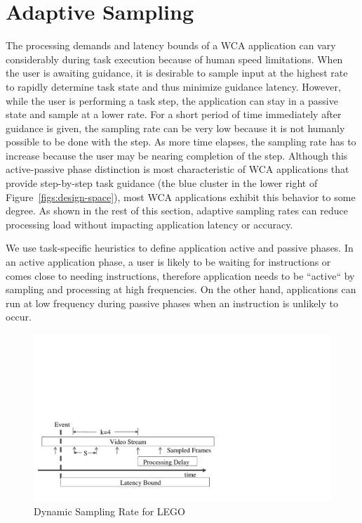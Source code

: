 \section{Adaptive Sampling}

The processing demands and latency bounds of a WCA application can
vary considerably during task execution because of human speed
limitations.  When the user is awaiting guidance, it is desirable to
sample input at the highest rate to rapidly determine task state and
thus minimize guidance latency.  However, while the user is performing
a task step, the application can stay in a passive state and sample at
a lower rate.  For a short period of time immediately after guidance
is given, the sampling rate can be very low because it is not humanly
possible to be done with the step.  As more time elapses, the
sampling rate has to increase because the user may be nearing
completion of the step.  Although this active-passive phase
distinction is most characteristic of WCA applications that provide
step-by-step task guidance (the blue cluster in
the lower right of Figure~\ref{figs:design-space}), most WCA
applications exhibit this behavior to some degree.  As shown in the
rest of this section, adaptive sampling rates can reduce processing
load without impacting application latency or accuracy.

We use task-specific heuristics to define application active and
passive phases.  In an active application phase, a user is likely to
be waiting for instructions or comes close to needing instructions,
therefore application needs to be ``active`` by sampling and
processing at high frequencies. On the other hand, applications can
run at low frequency during passive phases when an instruction is
unlikely to occur.

\begin{figure}
\centering
\includegraphics[width=\textwidth,trim=0em 3em 20em 15em, clip]{FIGS/fig-lego-sampling-model.pdf}
\caption{Dynamic Sampling Rate for LEGO}
\label{fig:lego-sampling-model}
\end{figure}

